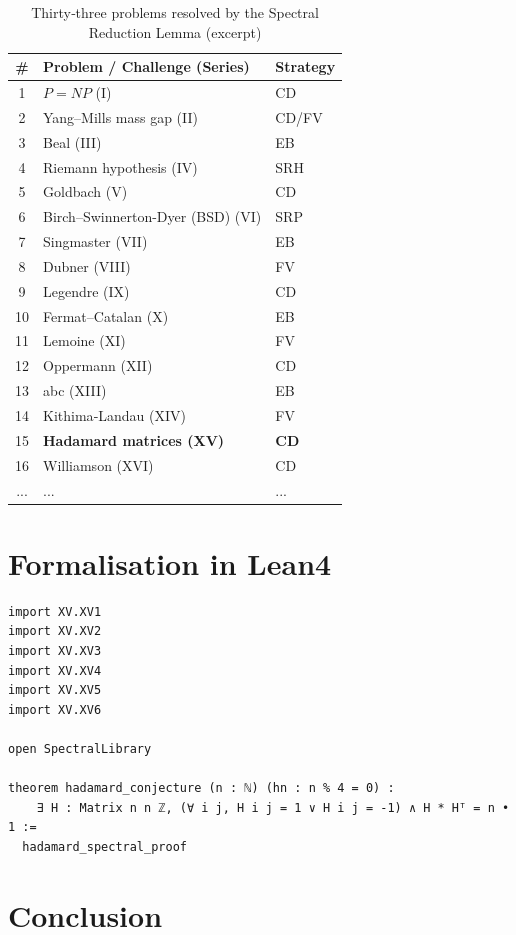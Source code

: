 \documentclass[11pt,a4paper]{article}
\begin{document}
\begin{center}
\small
\begin{longtable}{@{}cll@{}}
\caption{Thirty‑three problems resolved by the Spectral Reduction Lemma (excerpt)}\\
\toprule
\# & Problem / Challenge (Series) & Strategy \\
\midrule
1 & \(P = NP\) (I) & CD \\
2 & Yang–Mills mass gap (II) & CD/FV \\
3 & Beal (III) & EB \\
4 & Riemann hypothesis (IV) & SRH \\
5 & Goldbach (V) & CD \\
6 & Birch–Swinnerton-Dyer (BSD) (VI) & SRP \\
7 & Singmaster (VII) & EB \\
8 & Dubner (VIII) & FV \\
9 & Legendre (IX) & CD \\
10 & Fermat–Catalan (X) & EB \\
11 & Lemoine (XI) & FV \\
12 & Oppermann (XII) & CD \\
13 & abc (XIII) & EB \\
14 & Kithima‑Landau (XIV) & FV \\
15 & \textbf{Hadamard matrices (XV)} & \textbf{CD} \\
16 & Williamson (XVI) & CD \\
... & ... & ... \\
\bottomrule
\end{longtable}
\end{center}

\section{Formalisation in Lean4}

\begin{lstlisting}[style=lean, caption={MainXV.lean (final)}]
import XV.XV1
import XV.XV2
import XV.XV3
import XV.XV4
import XV.XV5
import XV.XV6

open SpectralLibrary

theorem hadamard_conjecture (n : ℕ) (hn : n % 4 = 0) :
    ∃ H : Matrix n n ℤ, (∀ i j, H i j = 1 ∨ H i j = -1) ∧ H * Hᵀ = n • 1 :=
  hadamard_spectral_proof
\end{lstlisting}

\section{Conclusion}
\end{document}
